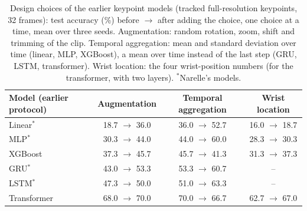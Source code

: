 \documentclass{article}
\begin{document}
\begin{table}[h]
\centering\footnotesize\setlength{\tabcolsep}{3pt}
\begin{tabular}{lccc}
\toprule
Model (earlier protocol) & Augmentation & Temporal aggregation & Wrist location \\
\midrule
Linear$^\ast$      & 18.7 $\to$ 36.0 & 36.0 $\to$ 52.7 & 16.0 $\to$ 18.7 \\
MLP$^\ast$         & 30.3 $\to$ 44.0 & 44.0 $\to$ 60.0 & 28.3 $\to$ 30.3 \\
XGBoost            & 37.3 $\to$ 45.7 & 45.7 $\to$ 41.3 & 31.3 $\to$ 37.3 \\
GRU$^\ast$         & 43.0 $\to$ 53.3 & 53.3 $\to$ 60.7 & -- \\
LSTM$^\ast$        & 47.3 $\to$ 50.0 & 51.0 $\to$ 63.3 & -- \\
Transformer        & 68.0 $\to$ 70.0 & 70.0 $\to$ 66.7 & 62.7 $\to$ 67.0 \\
\bottomrule
\end{tabular}
\caption{Design choices of the earlier keypoint models (tracked full-resolution keypoints, 32 frames): test accuracy (\%)
before $\to$ after adding the choice, one choice at a time, mean over three seeds. Augmentation: random rotation, zoom,
shift and trimming of the clip. Temporal aggregation: mean and standard deviation over time (linear, MLP, XGBoost), a mean
over time instead of the last step (GRU, LSTM, transformer). Wrist location: the four wrist-position numbers (for the
transformer, with two layers). $^\ast$Narelle's models.}
\label{tab:design}
\end{table}
\end{document}
